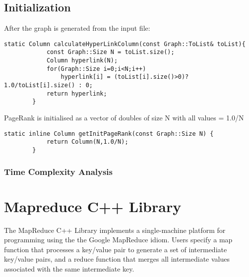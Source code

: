 \documentclass{article}
\newcommand{\cpp}{\lstinline[language=C++]}
\begin{document}
    \subsection{Initialization}
    After the graph is generated from the input file:
    \begin{lstlisting}[caption={ Calculating Hyperlink}] 
        static Column calculateHyperLinkColumn(const Graph::ToList& toList){
            const Graph::Size N = toList.size();
            Column hyperlink(N);
            for(Graph::Size i=0;i<N;i++)
                hyperlink[i] = (toList[i].size()>0)? 1.0/toList[i].size() : 0;
            return hyperlink;
        }
    \end{lstlisting}
    PageRank is initialised as a vector of doubles of size N with all values = 1.0/N
    \begin{lstlisting}[caption={ Initialising PageRank}] 
        static inline Column getInitPageRank(const Graph::Size N) {
            return Column(N,1.0/N);
        }
    \end{lstlisting}
 
    
    \subsubsection{Time Complexity Analysis}
    
    \clearpage
    \section{Mapreduce C++ Library}
    The MapReduce C++ Library implements a single-machine platform for programming using the the Google MapReduce idiom. Users specify a map function that processes a key/value pair to generate a set of intermediate key/value pairs, and a reduce function that merges all intermediate values associated with the same intermediate key. 
    
\end{document}
